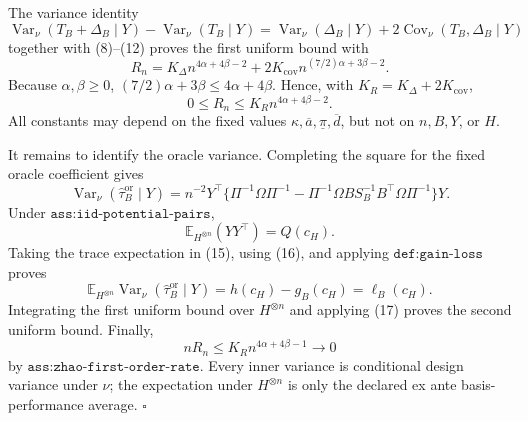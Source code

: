 The variance identity
\[
\operatorname{Var}_\nu(T_B+\Delta_B\mid Y)-\operatorname{Var}_\nu(T_B\mid Y)
=\operatorname{Var}_\nu(\Delta_B\mid Y)+2\operatorname{Cov}_\nu(T_B,\Delta_B\mid Y)
\]
together with (8)--(12) proves the first uniform bound with
\[
R_n=K_\Delta n^{4\alpha+4\beta-2}
+2K_{\mathrm{cov}}n^{(7/2)\alpha+3\beta-2}.
\tag{13}
\]
Because \(\alpha,\beta\ge0\), \((7/2)\alpha+3\beta\le4\alpha+4\beta\).  Hence, with \(K_R=K_\Delta+2K_{\mathrm{cov}}\),
\[
0\le R_n\le K_Rn^{4\alpha+4\beta-2}.
\tag{14}
\]
All constants may depend on the fixed values \(\kappa,\overline a,\underline\pi,\overline d\), but not on \(n,B,Y\), or \(H\).

It remains to identify the oracle variance.  Completing the square for the fixed oracle coefficient gives
\[
\operatorname{Var}_\nu(\widehat\tau_B^{\mathrm{or}}\mid Y)
=n^{-2}Y^\top\{\Pi^{-1}\Omega\Pi^{-1}
-\Pi^{-1}\Omega BS_B^{-1}B^\top\Omega\Pi^{-1}\}Y.
\tag{15}
\]
Under \(\texttt{ass:iid-potential-pairs}\),
\[
\mathbb E_{H^{\otimes n}}(YY^\top)=Q(c_H).
\tag{16}
\]
Taking the trace expectation in (15), using (16), and applying \(\texttt{def:gain-loss}\) proves
\[
\mathbb E_{H^{\otimes n}}
\operatorname{Var}_\nu(\widehat\tau_B^{\mathrm{or}}\mid Y)
=h(c_H)-g_B(c_H)=\ell_B(c_H).
\tag{17}
\]
Integrating the first uniform bound over \(H^{\otimes n}\) and applying (17) proves the second uniform bound.  Finally,
\[
nR_n\le K_Rn^{4\alpha+4\beta-1}\longrightarrow0
\]
by \(\texttt{ass:zhao-first-order-rate}\).  Every inner variance is conditional design variance under \(\nu\); the expectation under \(H^{\otimes n}\) is only the declared ex ante basis-performance average. \(\square\)
